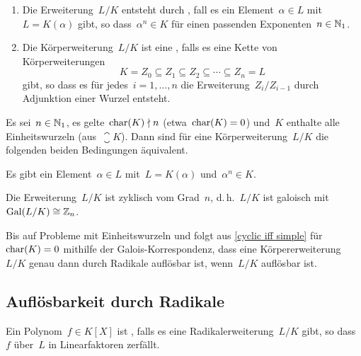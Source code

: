 \begin{definition}
  \leavevmode
  \begin{enumerate}
    \item
      Die Erweiterung~$L/K$ entsteht durch , fall es ein Element~$\alpha \in L$ mit~$L = K(\alpha)$ gibt, so dass~$\alpha^n \in K$ für einen passenden Exponenten~$n \in \mathbb{N}_1$.
    \item
      Die Körperweiterung~$L/K$ ist eine , falls es eine Kette von Körperweiterungen
      \[
        K = Z_0 \subseteq Z_1 \subseteq Z_2 \subseteq \dotsb \subseteq Z_n = L
      \]
      gibt, so dass es für jedes~$i = 1, \dotsc, n$ die Erweiterung~$Z_i / Z_{i-1}$ durch Adjunktion einer Wurzel entsteht.
  \end{enumerate}
\end{definition}

\begin{proposition}
  \label{cyclic iff simple}
  Es sei~$n \in \mathbb{N}_1$, es gelte~$\operatorname{char}(K) \nmid n$ (etwa~$\operatorname{char}(K) = 0$) und~$K$ enthalte alle~ Einheitswurzeln (aus~$\closure{K}$).
  Dann sind für eine Körperweiterung~$L/K$ die folgenden beiden Bedingungen äquivalent.
  \begin{equivlist}
    \item
      Es gibt ein Element~$\alpha \in L$ mit~$L = K(\alpha)$ und~$\alpha^n \in K$.
    \item
      Die Erweiterung~$L/K$ ist zyklisch vom Grad~$n$, d.\,h.~$L/K$ ist galoisch mit~$\operatorname{Gal}(L/K) \cong \mathbb{Z}_n$.
  \end{equivlist}
\end{proposition}

Bis auf Probleme mit Einheitswurzeln und folgt aus \cref{cyclic iff simple} für~$\operatorname{char}(K) = 0$ mithilfe der Galois-Korrespondenz, dass eine Körpererweiterung~$L/K$ genau dann durch Radikale auflösbar ist, wenn~$L/K$ auflösbar ist.


\subsection{Auflösbarkeit durch Radikale}

\begin{definition}
  Ein Polynom~$f \in K[X]$ ist , falls es eine Radikalerweiterung~$L/K$ gibt, so dass~$f$ über~$L$ in Linearfaktoren zerfällt. 
\end{definition}

